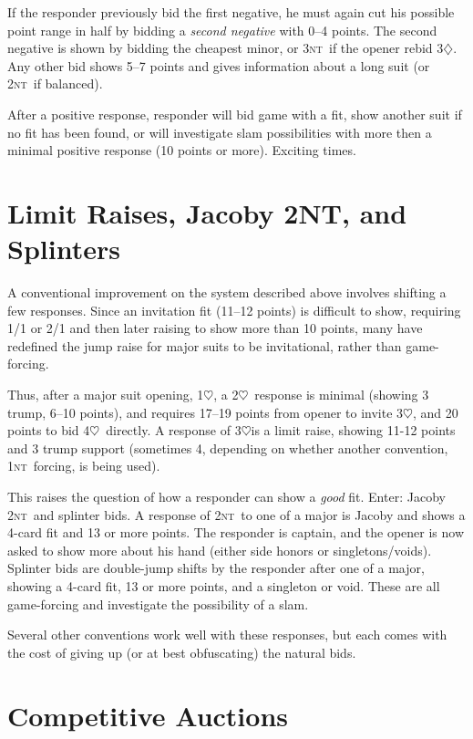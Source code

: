 \documentclass[11pt]{article}
\def\D{$\diamondsuit$}
\def\H{$\heartsuit$}
\def\NT{\textsc{nt}}
\begin{document}
If the responder previously bid the first negative, he must again cut
his possible point range in half by bidding a \emph{second negative}
with 0--4 points.  The second negative is shown by bidding the
cheapest minor, or 3\NT\ if the opener rebid 3\D.  Any other bid shows
5--7 points and gives information about a long suit (or 2\NT\ if balanced).

After a positive response, responder will bid game with a fit, show another
suit if no fit has been found, or will investigate slam possibilities with
more then a minimal positive response (10 points or more).  Exciting times.


\section{Limit Raises, Jacoby 2NT, and Splinters}

A conventional improvement on the system described above involves
shifting a few responses.  Since an invitation fit (11--12 points)
is difficult to show, requiring 1/1 or 2/1 and then later raising
to show more than 10 points, many have redefined the jump raise for
major suits to be invitational, rather than game-forcing.

Thus, after a major suit opening, 1\H, a 2\H\ response is minimal
(showing 3 trump, 6--10 points), and requires 17--19 points from opener
to invite 3\H, and 20 points to bid 4\H\ directly.  A response of
3\H is a limit raise, showing 11-12 points and 3 trump support
(sometimes 4, depending on whether another convention, 1\NT\ forcing,
is being used).

This raises the question of how a responder can show a \emph{good} fit.
Enter: Jacoby 2\NT\ and splinter bids.  A response of 2\NT\ to one
of a major is Jacoby and shows a 4-card fit and 13 or more points.
The responder is captain, and the opener is now asked to show more
about his hand (either side honors or singletons/voids).  Splinter
bids are double-jump shifts by the responder after one of a major, 
showing a 4-card fit, 13 or more points, and a singleton or void.
These are all game-forcing and investigate the possibility of a slam.

Several other conventions work well with these responses, but each
comes with the cost of giving up (or at best obfuscating) the
natural bids.

\section{Competitive Auctions}
\end{document}
